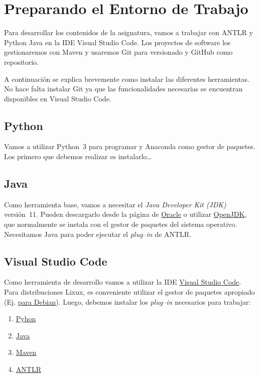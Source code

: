 \section{Preparando el Entorno de Trabajo}
\label{intro}

Para desarrollar los contenidos de la asignatura, vamos a trabajar con ANTLR y
\ifx\python\undefined
Python
\else
Java
\fi
en la IDE Visual Studio Code.  Los proyectos de software los gestionaremos con Maven y usaremos Git para versionado y GitHub como repositorio.

A continuación se explica brevemente como instalar las diferentes herramientas.  No hace falta instalar Git ya que las funcionalidades necesarias se encuentran disponibles en Visual Studio Code.

\ifx\python\undefined
\subsection{Python}
\label{python}

Vamos a utilizar Python~3 para programar y Anaconda como gestor de paquetes.  Los primero que debemos realizar es instalarlo\dots
\fi


\subsection{Java}
\label{Java}

Como herramienta base, vamos a necesitar el \emph{Java Developer Kit (JDK)} versión~11. Pueden descargarlo desde la página de \href{https://www.oracle.com/java/technologies/javase-downloads.html}{Oracle} o utilizar \href{https://openjdk.java.net/}{OpenJDK}, que normalmente se instala con el gestor de paquetes del sistema operativo.
\ifx\python\undefined
Necesitamos Java para poder ejecutar el \emph{plug--in} de ANTLR.
\fi

\subsection{Visual Studio Code}
\label{vscode}

Como herramienta de desarrollo vamos a utilizar la IDE \href{https://code.visualstudio.com/}{Visual Studio Code}.  Para distribuciones Lixux, es conveniente utilizar el gestor de paquetes apropiado (Ej. \href{https://wiki.debian.org/VisualStudioCode}{para Debian}).  Luego, debemos instalar los \emph{plug--in} necesarios para trabajar:
\begin{enumerate}
	\ifx\python\undefined
	\item \hyperref[pluginPython]{Pyhon}
	\fi
	\item \hyperref[pluginJava]{Java}
	\item \hyperref[pluginMaven]{Maven}
	\item \hyperref[pluginANTLR]{ANTLR}
\end{enumerate}


